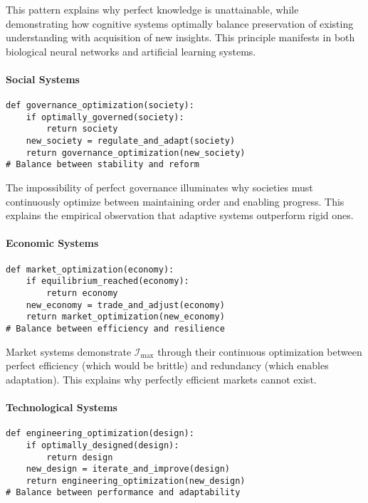 \documentclass[12pt]{article}
\begin{document}
This pattern explains why perfect knowledge is unattainable, while demonstrating how cognitive systems optimally balance preservation of existing understanding with acquisition of new insights. This principle manifests in both biological neural networks and artificial learning systems.

\paragraph{Social Systems}
\begin{verbatim}
def governance_optimization(society):
    if optimally_governed(society):
        return society
    new_society = regulate_and_adapt(society)
    return governance_optimization(new_society)
# Balance between stability and reform
\end{verbatim}

The impossibility of perfect governance illuminates why societies must continuously optimize between maintaining order and enabling progress. This explains the empirical observation that adaptive systems outperform rigid ones.

\paragraph{Economic Systems}
\begin{verbatim}
def market_optimization(economy):
    if equilibrium_reached(economy):
        return economy
    new_economy = trade_and_adjust(economy)
    return market_optimization(new_economy)
# Balance between efficiency and resilience
\end{verbatim}

Market systems demonstrate $\mathcal{I}_{\text{max}}$ through their continuous optimization between perfect efficiency (which would be brittle) and redundancy (which enables adaptation). This explains why perfectly efficient markets cannot exist.

\paragraph{Technological Systems}
\begin{verbatim}
def engineering_optimization(design):
    if optimally_designed(design):
        return design
    new_design = iterate_and_improve(design)
    return engineering_optimization(new_design)
# Balance between performance and adaptability
\end{verbatim}
\end{document}
